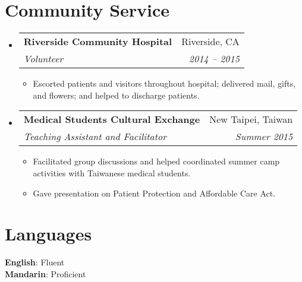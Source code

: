 \documentclass[letterpaper,11pt]{article}
\makeatletter
\newcommand{\cvProjectSubheading}[2]{
    \vspace{-2pt}\item
    \begin{tabular*}{0.97\textwidth}{l@{\extracolsep{\fill}}r}
      \small#1 & \textit{\small #2} \\
    \end{tabular*}\vspace{-7pt}
}
\newcommand{\cvSubheading}[4]{
  \vspace{-2pt}\item
    \begin{tabular*}{0.97\textwidth}[t]{l@{\extracolsep{\fill}}r}
      \textbf{#1} & #2 \\
      \textit{\small#3} & \textit{\small #4} \\
    \end{tabular*}\vspace{-7pt}
}
\newcommand{\cvItem}[1]{
  \item\small{
    {#1 \vspace{-2pt}}
  }
}
\newcommand{\cvSubHeadingListStart}{\begin{itemize}[leftmargin=0.15in, label={}]}
\newcommand{\cvSubHeadingListEnd}{\end{itemize}}
\newcommand{\cvItemListStart}{\begin{itemize}}
\newcommand{\cvItemListEnd}{\vspace{-5pt}\end{itemize}}
\makeatother
\begin{document}


\section{Community Service}
  \cvSubHeadingListStart
    \cvSubheading
    {Riverside Community Hospital}{Riverside, CA}
    {Volunteer}{2014 -- 2015}
      \cvItemListStart
         \cvItem{Escorted patients and visitors throughout hospital; delivered mail, gifts, and flowers; and helped to discharge patients.}
      \cvItemListEnd
      
    \cvSubheading{Medical Students Cultural Exchange}{New Taipei, Taiwan}{Teaching Assistant and Facilitator}{Summer 2015}
      \cvItemListStart
         \cvItem{Facilitated group discussions and helped coordinated summer camp activities with Taiwanese medical students.}
         \cvItem{Gave presentation on Patient Protection and Affordable Care Act.}
      \cvItemListEnd
  \cvSubHeadingListEnd

\section{Languages}
  \begin{itemize}[leftmargin=0.15in, label={}]
    \small{\item{
      \textbf{English}{: Fluent} \\
      \textbf{Mandarin}{: Proficient} \\
    }}
    \vspace{-3pt}
  \end{itemize}
\end{document}
